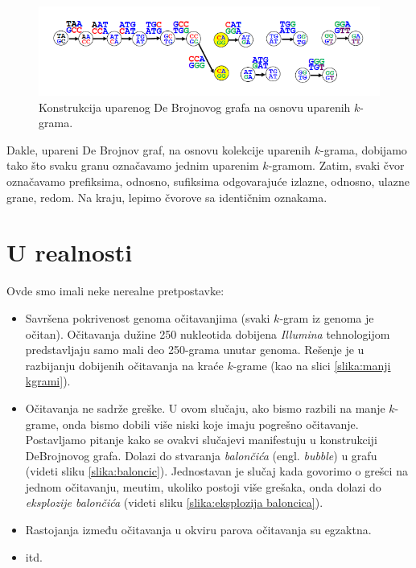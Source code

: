 \begin{figure}[h]
	\centering
	\includegraphics[width=1\textwidth]{poglavlja/3/slike/upareno_lepljenje2.png}
	\caption{Konstrukcija uparenog De Brojnovog grafa na osnovu uparenih $k$-grama.}
	\label{slika:uparenoLepljenje2}
\end{figure} 

Dakle, upareni De Brojnov graf, na osnovu kolekcije uparenih $k$-grama, dobijamo tako što svaku granu označavamo jednim uparenim $k$-gramom. Zatim, svaki čvor označavamo prefiksima, odnosno, sufiksima odgovaraju\'ce izlazne, odnosno, ulazne grane, redom. Na kraju, lepimo čvorove sa identičnim oznakama.

\section{U realnosti}

Ovde smo imali neke nerealne pretpostavke:

\begin{itemize}
	\item Savršena pokrivenost genoma očitavanjima (svaki $k$-gram iz genoma je očitan). Očitavanja dužine 250 nukleotida dobijena \emph{Illumina} tehnologijom predstavljaju samo mali deo 250-grama unutar genoma. Rešenje je u razbijanju dobijenih očitavanja na kraće $k$-grame (kao na slici \ref{slika:manji kgrami}).
	
	\item Očitavanja ne sadrže greške. U ovom slu\v caju, ako bismo razbili na manje $k$-grame, onda bismo dobili vi\v se niski koje imaju pogre\v sno o\v citavanje. Postavljamo pitanje kako se ovakvi slu\v cajevi manifestuju u konstrukciji DeBrojnovog grafa. Dolazi do stvaranja \emph{balon\v ci\'ca} (engl. \emph{bubble}) u grafu (videti sliku \ref{slika:baloncic}). Jednostavan je slu\v caj kada govorimo o gre\v sci na jednom o\v citavanju, me\dj utim, ukoliko postoji vi\v se gre\v saka, onda dolazi do \emph{eksplozije balon\v ci\'ca} (videti sliku \ref{slika:eksplozija baloncica}).
	
	\item Rastojanja između očitavanja u okviru parova očitavanja su egzaktna.
	
	\item itd.
\end{itemize}


